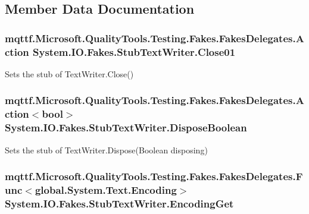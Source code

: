 \subsection{Member Data Documentation}
\hypertarget{class_system_1_1_i_o_1_1_fakes_1_1_stub_text_writer_a37dc561688bfd17ed52315781191a6e4}{
\subsubsection[{Close01}]{\setlength{\rightskip}{0pt plus 5cm}mqttf.\-Microsoft.\-Quality\-Tools.\-Testing.\-Fakes.\-Fakes\-Delegates.\-Action System.\-I\-O.\-Fakes.\-Stub\-Text\-Writer.\-Close01}}\label{class_system_1_1_i_o_1_1_fakes_1_1_stub_text_writer_a37dc561688bfd17ed52315781191a6e4}


Sets the stub of Text\-Writer.\-Close()

\hypertarget{class_system_1_1_i_o_1_1_fakes_1_1_stub_text_writer_a1ae7ba87739c2d5707ffc5a775fbc5b9}{
\subsubsection[{Dispose\-Boolean}]{\setlength{\rightskip}{0pt plus 5cm}mqttf.\-Microsoft.\-Quality\-Tools.\-Testing.\-Fakes.\-Fakes\-Delegates.\-Action$<$bool$>$ System.\-I\-O.\-Fakes.\-Stub\-Text\-Writer.\-Dispose\-Boolean}}\label{class_system_1_1_i_o_1_1_fakes_1_1_stub_text_writer_a1ae7ba87739c2d5707ffc5a775fbc5b9}


Sets the stub of Text\-Writer.\-Dispose(\-Boolean disposing)

\hypertarget{class_system_1_1_i_o_1_1_fakes_1_1_stub_text_writer_a96dcf5702b8f1df1330348e804dc2900}{
\subsubsection[{Encoding\-Get}]{\setlength{\rightskip}{0pt plus 5cm}mqttf.\-Microsoft.\-Quality\-Tools.\-Testing.\-Fakes.\-Fakes\-Delegates.\-Func$<$global.\-System.\-Text.\-Encoding$>$ System.\-I\-O.\-Fakes.\-Stub\-Text\-Writer.\-Encoding\-Get}}\label{class_system_1_1_i_o_1_1_fakes_1_1_stub_text_writer_a96dcf5702b8f1df1330348e804dc2900}


